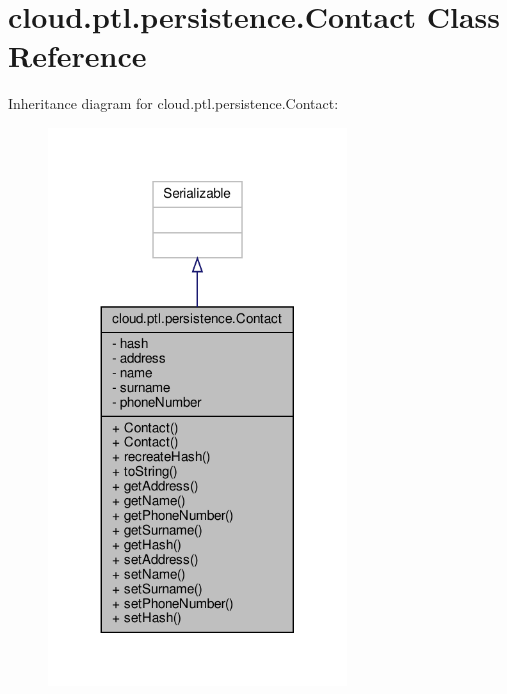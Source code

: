 \hypertarget{classcloud_1_1ptl_1_1persistence_1_1Contact}{}\section{cloud.\+ptl.\+persistence.\+Contact Class Reference}
\label{classcloud_1_1ptl_1_1persistence_1_1Contact}


Inheritance diagram for cloud.\+ptl.\+persistence.\+Contact\+:
\nopagebreak
\begin{figure}[H]
\begin{center}
\leavevmode
\includegraphics[width=224pt]{classcloud_1_1ptl_1_1persistence_1_1Contact__inherit__graph}
\end{center}
\end{figure}


